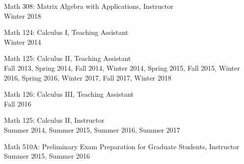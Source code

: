 \documentclass[12pt]{article}
\newenvironment{date_section}
	{
	\vspace{-1ex}
	\leftmargini = 15ex
		\begin{itemize}[
			labelsep = *,
			labelwidth = 9ex,
			labelindent = 0ex,
			itemindent = !,
			font=\normalfont,
			align=parleft
		]{}
		\itemsep=-1.5mm
	}
	{\end{itemize}\vspace{-2ex}}
\newcommand{\yearmo}[2]{
	\item[
		{\makebox[1ex][r]{#1}}
		\hspace{1ex}
		{\makebox[1ex][l]{#2} }
		] }
\begin{document}
	\begin{date_section}
		\yearmo{}{} Math 308: Matrix Algebra with Applications, Instructor
		\\
		Winter 2018
		
		\yearmo{}{} Math 124: Calculus I, Teaching Assistant
		\\
		Winter 2014
		
		\yearmo{}{} Math 125: Calculus II, Teaching Assistant
		\\
		Fall 2013, Spring 2014, Fall 2014, Winter 2014, Spring 2015, Fall 2015, Winter 2016, Spring 2016, Winter 2017, Fall 2017, Winter 2018
		
		\yearmo{}{} Math 126: Calculus III, Teaching Assistant
		\\
		Fall 2016
		
		\yearmo{}{} Math 125: Calculus II, Instructor
		\\
		Summer 2014, Summer 2015, Summer 2016, Summer 2017
		
		\yearmo{}{} Math 510A: Preliminary Exam Preparation for Graduate Students, Instructor
		\\
		Summer 2015, Summer 2016
		
		
		
	\end{date_section}
\end{document}
